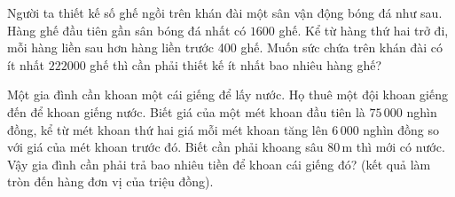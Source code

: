 \begin{bt}%

	Người ta thiết kế số ghế ngồi trên khán đài một sân vận động bóng đá như sau. Hàng ghế đầu tiên gần sân bóng đá nhất có $1600$ ghế. Kể từ hàng thứ hai trở đi, mỗi hàng liền sau hơn hàng liền trước 400 ghế. Muốn sức chứa trên khán đài có ít nhất $222000$ ghế thì cần phải thiết kế ít nhất bao nhiêu hàng ghế?
\end{bt}

\begin{bt}%

Một gia đình cần khoan một cái giếng để lấy nước. Họ thuê một đội khoan giếng đến để khoan giếng nước. Biết giá của một mét khoan đầu tiên là $75\,000$ nghìn đồng, kể từ mét khoan thứ hai giá mỗi mét khoan tăng lên $6\,000$ nghìn đồng so với giá của mét khoan trước đó. Biết cần phải khoang sâu $80\mathrm{\,m}$ thì mới có nước. Vậy gia đình cần phải trả bao nhiêu tiền để khoan cái giếng đó? (kết quả làm tròn đến hàng đơn vị của triệu đồng).
\end{bt}

